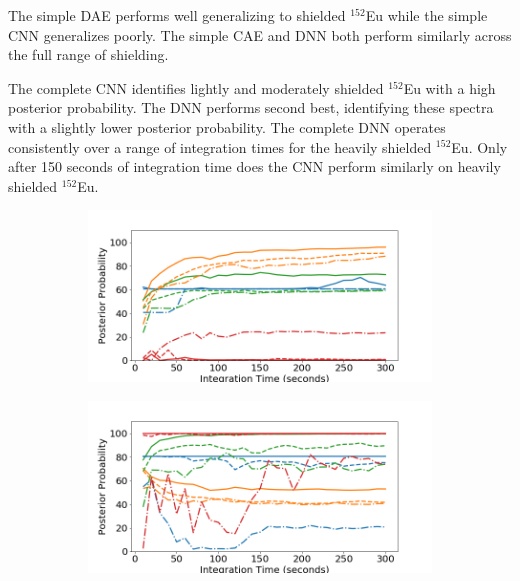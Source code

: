 The simple DAE performs well generalizing to shielded $^{152}$Eu while the simple CNN generalizes poorly. The simple CAE and DNN both perform similarly across the full range of shielding. 

The complete CNN identifies lightly and moderately shielded $^{152}$Eu with a high posterior probability. The DNN performs second best, identifying these spectra with a slightly lower posterior probability. The complete DNN operates consistently over a range of integration times for the heavily shielded $^{152}$Eu. Only after 150 seconds of integration time does the CNN perform similarly on heavily shielded $^{152}$Eu. %




\begin{figure}[H]
     \centering
     \begin{subfigure}[b]{0.49\textwidth}
         \centering
         \includegraphics[width=\textwidth]{images/iron-eu152-easy.png}
         \caption{}
         \label{fig:iron-eu152-easy}
     \end{subfigure}
     \hfill
     \begin{subfigure}[b]{0.49\textwidth}
         \centering
         \includegraphics[width=\textwidth]{images/iron-eu152-full.png}

\end{subfigure}
\end{figure}
